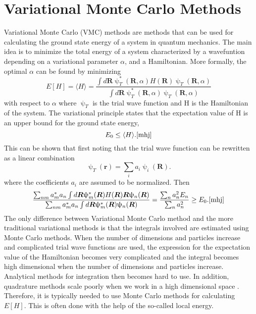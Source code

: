 \section{Variational Monte Carlo Methods}

Variational Monte Carlo (VMC) methods are methods that can be used for calculating the ground state energy of a system in quantum mechanics. The main idea is to minimize the total energy of a system characterized by a wavefuntion depending on a variational parameter $\alpha$, and a Hamiltonian. More formally, the optimal $\alpha$ can be found by minimizing 
\begin{equation}
    E[H] = \langle H \rangle = \frac{\int d\boldsymbol{R}\uppsi_T^*(\boldsymbol{R}, \alpha)H(\boldsymbol{R})\uppsi_T(\boldsymbol{R}, \alpha)}{\int d\boldsymbol{R}\uppsi_T^*(\boldsymbol{R}, \alpha)\uppsi_T(\boldsymbol{R}, \alpha)}
    \label{eq:energy}
\end{equation}
with respect to $\alpha$ where $\uppsi_T$ is the trial wave function and H is the Hamiltonian of the system. The variational principle states that the expectation value of H is an upper bound for the ground state energy, 
\begin{equation}
    E_0 \leq \langle H \rangle. \cite{mhj}
\end{equation}
This can be shown that first noting that the trial wave function can be rewritten as a linear combination
\begin{equation}
    \uppsi_T(\boldsymbol{r}) = \sum_i a_i \uppsi_i(\boldsymbol{R}). 
\end{equation}
where the coefficients $a_i$ are assumed to be normalized. Then 
\begin{equation}
    \frac{\sum_{nm}a^*_m a_n \int d\boldsymbol{R}\uppsi^*_m(\boldsymbol{R})H(\boldsymbol{R})\boldsymbol{R}\uppsi_n(\boldsymbol{R})}{\sum_{nm}a^*_ma_n\int d\boldsymbol{R}\uppsi^*_m(\boldsymbol{R})\uppsi_n(\boldsymbol{R})} = \frac{\sum_n a_n^2 E_n}{\sum_n a_n^2} \geq E_0. \cite{mhj}
\end{equation}
The only difference between Variational Monte Carlo method and the more traditional variational methods is that the integrals involved are estimated using Monte Carlo methods. When the number of dimensions and particles increase and complicated trial wave functions are used, the expression for the expectation value of the Hamiltonian becomes very complicated and the integral becomes high dimensional when the number of dimensions and particles increase. Analytical methods for integration then becomes hard to use. In addition, quadrature methods scale poorly when we work in a high dimensional space \cite{compstat}. Therefore, it is typically needed to use Monte Carlo methods for calculating $E[H]$.  This is often done with the help of the so-called local energy. 


